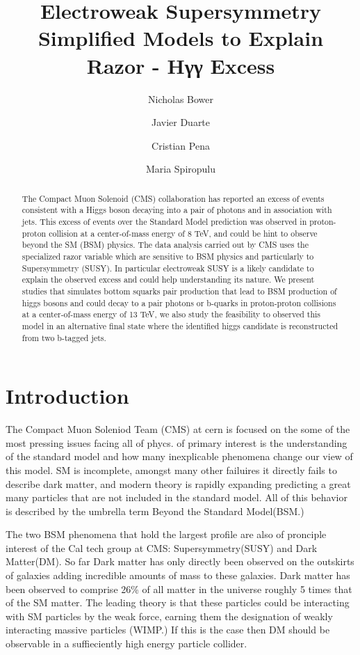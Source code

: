 \documentclass[twocolumn,aps,prd,reprint]{revtex4-1}
\begin{document}

\title{Electroweak Supersymmetry Simplified Models to Explain Razor - Hγγ Excess}
\author{Nicholas Bower}
\author{Javier Duarte}
\author{Cristian Pena}
\author{Maria Spiropulu}
\begin{abstract}
The Compact Muon Solenoid (CMS) collaboration has reported an excess of events consistent with a Higgs boson decaying into a pair of photons and in association with jets. This excess of events over the Standard Model prediction was observed in proton-proton collision at a center-of-mass energy of 8 TeV, and could be hint to observe beyond the SM  (BSM) physics. The data analysis carried out by CMS uses the specialized razor variable which are sensitive to BSM physics and particularly to Supersymmetry (SUSY). In particular electroweak SUSY is a likely candidate to explain the observed excess and could help understanding its nature. We present studies that simulates bottom squarks pair production that lead to BSM production of higgs bosons and could decay to a pair photons or b-quarks in proton-proton collisions at a center-of-mass energy of 13 TeV, we also study the feasibility to observed this model in an alternative final state where the identified higgs candidate is reconstructed from two b-tagged jets.
\end{abstract}
\maketitle
\section{Introduction}
The Compact Muon Soleniod Team (CMS) at cern is focused on the some of the most pressing issues facing all of phycs. of primary interest is the understanding of the standard model and how many inexplicable phenomena change our view of this model. SM is incomplete, amongst many other failuires it directly fails to describe dark matter, and modern theory is rapidly expanding predicting a great many particles that are not included in the standard model. All of this behavior is described by the umbrella term Beyond the Standard Model(BSM.)

The two BSM phenomena that hold the largest profile are also of pronciple interest of the Cal tech group at CMS: Supersymmetry(SUSY) and Dark Matter(DM). So far Dark matter has only directly been observed on the outskirts of galaxies adding incredible amounts of mass to these galaxies. Dark matter has been observed to comprise 26\% of all matter in the universe roughly 5 times that of the SM matter. The leading theory is that these particles could be interacting with SM particles by the weak force, earning them the designation of weakly interacting massive particles (WIMP.) If this is the case then DM should be observable in a suffieciently high energy particle collider. 
\end{document}
